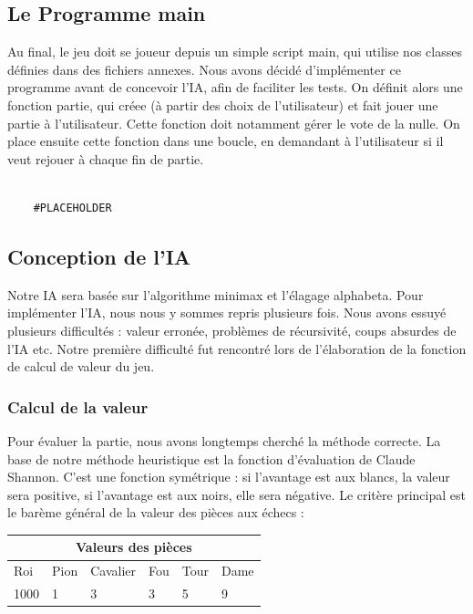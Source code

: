 \documentclass{article}
\begin{document}
\subsection{Le Programme main}
Au final, le jeu doit se joueur depuis un simple script main, qui utilise nos classes
définies dans des fichiers annexes.
Nous avons décidé d'implémenter ce programme avant de concevoir l'IA, 
afin de faciliter les tests.
On définit alors une fonction partie, qui créee (à partir des choix de l'utilisateur) et fait jouer une partie à l'utilisateur.
Cette fonction doit notamment gérer le vote de la nulle.
On place ensuite cette fonction dans une boucle, en demandant à l'utilisateur si il veut rejouer
à chaque fin de partie.
\begin{verbatim}

    #PLACEHOLDER
\end{verbatim}
\subsection{Conception de l'IA}
Notre IA sera basée sur l'algorithme minimax et l'élagage alphabeta.
Pour implémenter l'IA, nous nous y sommes repris plusieurs fois.
Nous avons essuyé plusieurs difficultés : valeur erronée, problèmes de récursivité, coups absurdes de l'IA etc.
Notre première difficulté fut rencontré lors de l'élaboration de la fonction de calcul de valeur du jeu.

\subsubsection{Calcul de la valeur}

Pour évaluer la partie, nous avons longtemps cherché la méthode correcte. 
La base de notre méthode heuristique
est la fonction d'évaluation de Claude Shannon. C'est une fonction symétrique : si l'avantage est aux blancs,
la valeur sera positive, si l'avantage est aux noirs, elle sera négative.
Le critère principal est le barème général de la valeur des pièces aux échecs : \\
\begin{tabular}{ |p{3cm}||p{3cm}|p{3cm}|p{3cm}|p{3cm}|p{3cm}|  }
    \hline
    \multicolumn{6}{|c|}{Valeurs des pièces} \\
    \hline 
    Roi&Pion&Cavalier&Fou&Tour&Dame \\ 
    \hline 
1000&1&3&3&5&9 \\
\hline
\end{tabular} 
\end{document}
